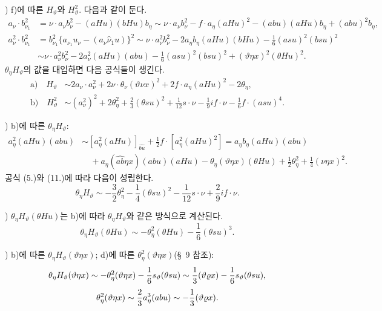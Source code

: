 ) f)에 따른 $H_\vartheta$와 $H_\vartheta^2$. 다음과 같이 둔다.
\[
\begin{aligned}
a_\nu\cdot b_{\nu_1}^2
&=\nu\cdot a_\nu b_\nu^2-(aHu)(bHu)b_\eta
\sim \nu\cdot a_\nu b_\nu^2-f\cdot a_\eta(aHu)^2-(abu)(aHu)b_\eta+(abu)^2b_\eta,\\
a_\nu^2\cdot b_{\nu_1}^2
&=b_{\nu_1}^2\{a_{\nu_1}u_\nu-(a_\nu\widehat{\nu}_1u)\}^2
\sim \nu\cdot a_\nu^2b_\nu^2-2a_\eta b_\eta(aHu)(bHu)-\frac16(asu)^2(bsu)^2\\
&\sim \nu\cdot a_\nu^2b_\nu^2-2a_\nu^2(aHu)(abu)-\frac16(asu)^2(bsu)^2+(\vartheta\eta x)^2(\theta Hu)^2.
\end{aligned}
\]
$\theta_\eta H_\vartheta$의 값을 대입하면 다음 공식들이 생긴다.
\[
\tag{12}
\begin{aligned}
\text{a)}\quad H_\vartheta&\sim 2a_\nu\cdot a_\nu^2+2\nu\cdot\theta_\nu(\vartheta\nu x)^2+2f\cdot a_\eta(aHu)^2-2\theta_\eta,\\
\text{b)}\quad H_\vartheta^2&\sim (a_\nu^2)^2+2\theta_\eta^2+\frac23(\theta su)^2+\frac1{12}s\cdot\nu-\frac19 i f\cdot\nu-\frac16f\cdot(asu)^4.
\end{aligned}
\]

) b)에 따른 $\theta_\eta H_\vartheta$:
\[
\begin{aligned}
a_\eta^2(aHu)(abu)
&\sim [a_\eta^2(aHu)]_{\widehat{bu}}+\frac12 f\cdot[a_\eta^2(aHu)^2]
=a_\eta b_\eta(aHu)(abu)\\
&\quad+a_\eta(\widehat{ab}\eta x)(abu)(aHu)-\theta_\eta(\vartheta\eta x)(\theta Hu)+\frac12\theta_\eta^2+\frac14(\nu\eta x)^2.
\end{aligned}
\]
공식 (5.)와 (11.)에 따라 다음이 성립한다.
\[
\theta_\eta H_\vartheta\sim-\frac32\theta_\eta^2-\frac14(\theta su)^2-\frac1{12}s\cdot\nu+\frac29 i f\cdot\nu.
\]

) $\theta_\eta H_\vartheta(\theta Hu)$는 b)에 따라 $\theta_\eta H_\vartheta$와 같은 방식으로 계산된다.
\[
\theta_\eta H_\vartheta(\theta Hu)\sim-\theta_\eta^2(\theta Hu)-\frac16(\theta su)^3.
\]

) b)에 따른 $\theta_\eta H_\vartheta(\vartheta\eta x)$; d)에 따른 $\theta_\eta^2(\vartheta\eta x)$(\S\ 9 참조):
\[
\theta_\eta H_\vartheta(\vartheta\eta x)\sim-\theta_\eta^2(\vartheta\eta x)-\frac16s_\vartheta(\theta su)
\sim\frac13(\vartheta\varrho x)-\frac16s_\vartheta(\theta su),
\]
\[
\theta_\eta^2(\vartheta\eta x)\sim\frac23a_\eta^3(abu)\sim-\frac13(\vartheta\varrho x).
\]

